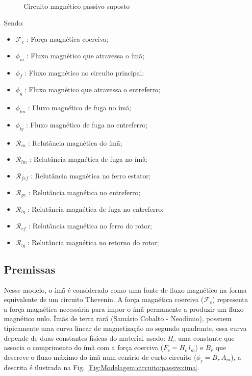 \begin{figure}[!ht]
	\centering
	\def\svgwidth{1\columnwidth}
	
	\caption{Circuito magnético passivo suposto}
	\label{Fig:Modelagem:circuito:passivo:umlado}
\end{figure}


Sendo:
\begin{itemize}
	\item $\mathcal{F}_c$ :  Força magnética coerciva;
	\item $\phi_m$ : Fluxo magnético que atravessa o ímã;
	\item $\phi_f$ : Fluxo magnético no circuíto principal;
	\item $\phi_g$ : Fluxo magnético que atravessa o entreferro;
	\item $\phi_{lm}$ : Fluxo magnético de fuga no ímã;
	\item $\phi_{lg}$ : Fluxo magnético de fuga no entreferro;
	\item $\mathcal{R}_m$ : Relutância magnética do ímã;
	\item $\mathcal{R}_{lm}$ : Relutância magnética de fuga no ímã;
	\item $\mathcal{R}_{fef}$ : Relutância magnética no ferro estator;
	\item $\mathcal{R}_{ge}$ : Relutância magnética no entreferro;
	\item $\mathcal{R}_{lg}$ : Relutância magnética de fuga no entreferro;
	\item $\mathcal{R}_{rf}$ : Relutância magnética no ferro do rotor;
	\item $\mathcal{R}_{lg}$ : Relutância magnética no retorno do rotor;
\end{itemize}

\subsection{Premissas}

Nesse modelo, o ímã é considerado como uma fonte de fluxo magnético na forma equivalente de um circuito Thevenin. A força magnética coerciva ($\mathcal{F}_c$) representa a força magnética necessária para impor o ímã permanente a produzir um fluxo magnético nulo. Ímãs de terra rará (Samário Cobalto - Neodímio), possuem tipicamente uma curva linear de magnetização no segundo quadrante, essa curva depende de duas constantes físicas do material usado: $H_c$ uma constante que associa o comprimento do ímã com a força coerciva ($ F_c = H_c \, l_m$) e $B_r$ que descreve o fluxo máximo do ímã num cenário de curto circuíto ($\phi_r = B_r \, A_m$), a descrita é ilustrada na Fig. \ref{Fig:Modelagem:circuito:passivo:ima}.

